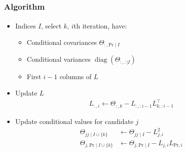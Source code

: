 \documentclass{beamer}                             %
\DeclareMathOperator{\diag}{diag}
\begin{document}
\begin{frame}
\frametitle{Algorithm}
\framesubtitle{}
\begin{itemize}
  \item<+-> Indices \( I \), select \( k \), \( i \)th iteration, have:
    \begin{itemize}
      \item Conditional covariances \( \Theta_{:, \text{Pr} \mid I} \)
      \item Conditional variances \( \diag(\Theta_{:, : \mid I}) \)
      \item First \( i - 1 \) columns of \( L \)
    \end{itemize}
  \item<+-> Update \( L \)
    \begin{align*}
        L_{:, i} \gets
          \Theta_{:, k} - L_{:, :i - 1} L_{k, :i - 1}^{\top}
    \end{align*}
  \item<+-> Update conditional values for candidate \( j \)
    \begin{align*}
      \Theta_{jj \mid I \cup \{ k \}} &\gets
        \Theta_{jj \mid I} - L_{j, i}^2 \\
      \Theta_{j, \text{Pr} \mid I \cup \{ k \}} &\gets
        \Theta_{j, \text{Pr} \mid I} - L_{j, i} L_{\text{Pr}, i}
    \end{align*}
\end{itemize}
\end{frame}
\end{document}
